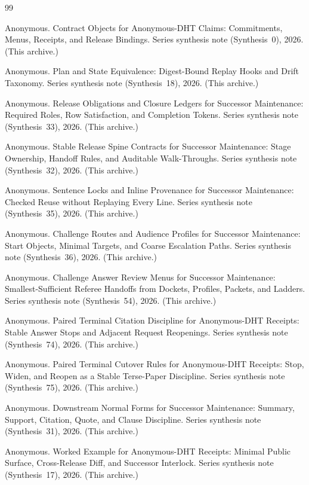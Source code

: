\documentclass[11pt]{article}
\begin{document}
\begin{thebibliography}{99}\small

Anonymous.
\newblock Contract Objects for Anonymous-DHT Claims: Commitments, Menus, Receipts, and Release Bindings.
\newblock Series synthesis note (Synthesis~0), 2026. (This archive.)

Anonymous.
\newblock Plan and State Equivalence: Digest-Bound Replay Hooks and Drift Taxonomy.
\newblock Series synthesis note (Synthesis~18), 2026. (This archive.)

Anonymous.
\newblock Release Obligations and Closure Ledgers for Successor Maintenance: Required Roles, Row Satisfaction, and Completion Tokens.
\newblock Series synthesis note (Synthesis~33), 2026. (This archive.)

Anonymous.
\newblock Stable Release Spine Contracts for Successor Maintenance: Stage Ownership, Handoff Rules, and Auditable Walk-Throughs.
\newblock Series synthesis note (Synthesis~32), 2026. (This archive.)

Anonymous.
\newblock Sentence Locks and Inline Provenance for Successor Maintenance: Checked Reuse without Replaying Every Line.
\newblock Series synthesis note (Synthesis~35), 2026. (This archive.)

Anonymous.
\newblock Challenge Routes and Audience Profiles for Successor Maintenance: Start Objects, Minimal Targets, and Coarse Escalation Paths.
\newblock Series synthesis note (Synthesis~36), 2026. (This archive.)

Anonymous.
\newblock Challenge Answer Review Menus for Successor Maintenance: Smallest-Sufficient Referee Handoffs from Dockets, Profiles, Packets, and Ladders.
\newblock Series synthesis note (Synthesis~54), 2026. (This archive.)

Anonymous.
\newblock Paired Terminal Citation Discipline for Anonymous-DHT Receipts: Stable Answer Stops and Adjacent Request Reopenings.
\newblock Series synthesis note (Synthesis~74), 2026. (This archive.)

Anonymous.
\newblock Paired Terminal Cutover Rules for Anonymous-DHT Receipts: Stop, Widen, and Reopen as a Stable Terse-Paper Discipline.
\newblock Series synthesis note (Synthesis~75), 2026. (This archive.)

Anonymous.
\newblock Downstream Normal Forms for Successor Maintenance: Summary, Support, Citation, Quote, and Clause Discipline.
\newblock Series synthesis note (Synthesis~31), 2026. (This archive.)

Anonymous.
\newblock Worked Example for Anonymous-DHT Receipts: Minimal Public Surface, Cross-Release Diff, and Successor Interlock.
\newblock Series synthesis note (Synthesis~17), 2026. (This archive.)

\end{thebibliography}
\end{document}
